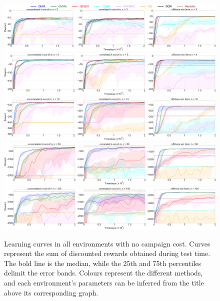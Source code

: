 \begin{figure}
\includegraphics[width=\textwidth]{figures/ch5/all_3_cc_False.pdf}
\includegraphics[width=\textwidth]{figures/ch5/all_5_cc_False.pdf}
\includegraphics[width=\textwidth]{figures/ch5/all_10_cc_False.pdf}
\includegraphics[width=\textwidth]{figures/ch5/all_50_cc_False.pdf}
\includegraphics[width=\textwidth]{figures/ch5/all_100_cc_False.pdf}
\caption{
Learning curves in all environments with no campaign cost. 
Curves represent the sum of discounted rewards obtained during test time.
The bold line is the median, while the 25th and 75th percentiles delimit the error bands.
Colours represent the different methods, and each environment's parameters can be inferred from the title above its corresponding graph.
}
\label{fig:learning_curves_cc_false}
\end{figure}

